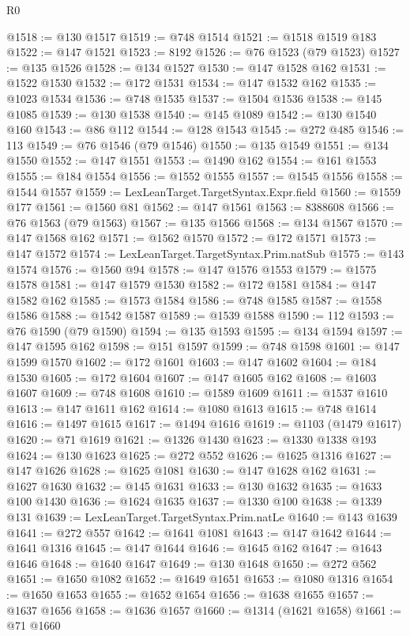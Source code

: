 \begin{lexlean}{R0}
\begin{coremodule}
@1518 := @130 @1517
@1519 := @748 @1514
@1521 := @1518 @1519 @183
@1522 := @147 @1521
@1523 := 8192
@1526 := @76 @1523 (@79 @1523)
@1527 := @135 @1526
@1528 := @134 @1527
@1530 := @147 @1528 @162
@1531 := @1522 @1530
@1532 := @172 @1531
@1534 := @147 @1532 @162
@1535 := @1023 @1534
@1536 := @748 @1535
@1537 := @1504 @1536
@1538 := @145 @1085
@1539 := @130 @1538
@1540 := @145 @1089
@1542 := @130 @1540 @160
@1543 := @86 @112
@1544 := @128 @1543
@1545 := @272 @485
@1546 := 113
@1549 := @76 @1546 (@79 @1546)
@1550 := @135 @1549
@1551 := @134 @1550
@1552 := @147 @1551
@1553 := @1490 @162
@1554 := @161 @1553
@1555 := @184 @1554
@1556 := @1552 @1555
@1557 := @1545 @1556
@1558 := @1544 @1557
@1559 := LexLeanTarget.TargetSyntax.Expr.field
@1560 := @1559 @177
@1561 := @1560 @81
@1562 := @147 @1561
@1563 := 8388608
@1566 := @76 @1563 (@79 @1563)
@1567 := @135 @1566
@1568 := @134 @1567
@1570 := @147 @1568 @162
@1571 := @1562 @1570
@1572 := @172 @1571
@1573 := @147 @1572
@1574 := LexLeanTarget.TargetSyntax.Prim.natSub
@1575 := @143 @1574
@1576 := @1560 @94
@1578 := @147 @1576 @1553
@1579 := @1575 @1578
@1581 := @147 @1579 @1530
@1582 := @172 @1581
@1584 := @147 @1582 @162
@1585 := @1573 @1584
@1586 := @748 @1585
@1587 := @1558 @1586
@1588 := @1542 @1587
@1589 := @1539 @1588
@1590 := 112
@1593 := @76 @1590 (@79 @1590)
@1594 := @135 @1593
@1595 := @134 @1594
@1597 := @147 @1595 @162
@1598 := @151 @1597
@1599 := @748 @1598
@1601 := @147 @1599 @1570
@1602 := @172 @1601
@1603 := @147 @1602
@1604 := @184 @1530
@1605 := @172 @1604
@1607 := @147 @1605 @162
@1608 := @1603 @1607
@1609 := @748 @1608
@1610 := @1589 @1609
@1611 := @1537 @1610
@1613 := @147 @1611 @162
@1614 := @1080 @1613
@1615 := @748 @1614
@1616 := @1497 @1615
@1617 := @1494 @1616
@1619 := @1103 (@1479 @1617)
@1620 := @71 @1619
@1621 := @1326 @1430
@1623 := @1330 @1338 @193
@1624 := @130 @1623
@1625 := @272 @552
@1626 := @1625 @1316
@1627 := @147 @1626
@1628 := @1625 @1081
@1630 := @147 @1628 @162
@1631 := @1627 @1630
@1632 := @145 @1631
@1633 := @130 @1632
@1635 := @1633 @100 @1430
@1636 := @1624 @1635
@1637 := @1330 @100
@1638 := @1339 @131
@1639 := LexLeanTarget.TargetSyntax.Prim.natLe
@1640 := @143 @1639
@1641 := @272 @557
@1642 := @1641 @1081
@1643 := @147 @1642
@1644 := @1641 @1316
@1645 := @147 @1644
@1646 := @1645 @162
@1647 := @1643 @1646
@1648 := @1640 @1647
@1649 := @130 @1648
@1650 := @272 @562
@1651 := @1650 @1082
@1652 := @1649 @1651
@1653 := @1080 @1316
@1654 := @1650 @1653
@1655 := @1652 @1654
@1656 := @1638 @1655
@1657 := @1637 @1656
@1658 := @1636 @1657
@1660 := @1314 (@1621 @1658)
@1661 := @71 @1660

\end{coremodule}
\end{lexlean}
